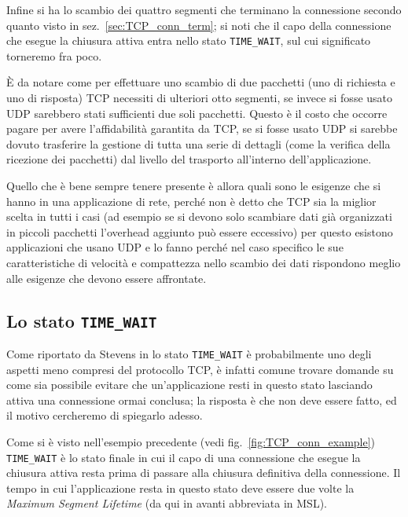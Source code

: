 Infine si ha lo scambio dei quattro segmenti che terminano la connessione
secondo quanto visto in sez.~\ref{sec:TCP_conn_term}; si noti che il capo della
connessione che esegue la chiusura attiva entra nello stato
\texttt{TIME\_WAIT}, sul cui significato torneremo fra poco.

È da notare come per effettuare uno scambio di due pacchetti (uno di richiesta
e uno di risposta) TCP necessiti di ulteriori otto segmenti, se invece si
fosse usato UDP sarebbero stati sufficienti due soli pacchetti. Questo è il
costo che occorre pagare per avere l'affidabilità garantita da TCP, se si
fosse usato UDP si sarebbe dovuto trasferire la gestione di tutta una serie di
dettagli (come la verifica della ricezione dei pacchetti) dal livello del
trasporto all'interno dell'applicazione.

Quello che è bene sempre tenere presente è allora quali sono le esigenze che
si hanno in una applicazione di rete, perché non è detto che TCP sia la
miglior scelta in tutti i casi (ad esempio se si devono solo scambiare dati
già organizzati in piccoli pacchetti l'overhead aggiunto può essere eccessivo)
per questo esistono applicazioni che usano UDP e lo fanno perché nel caso
specifico le sue caratteristiche di velocità e compattezza nello scambio dei
dati rispondono meglio alle esigenze che devono essere affrontate.


\subsection{Lo stato \texttt{TIME\_WAIT}}
\label{sec:TCP_time_wait}

Come riportato da Stevens in \cite{UNP1} lo stato \texttt{TIME\_WAIT} è
probabilmente uno degli aspetti meno compresi del protocollo TCP, è infatti
comune trovare domande su come sia possibile evitare che un'applicazione resti
in questo stato lasciando attiva una connessione ormai conclusa; la risposta è
che non deve essere fatto, ed il motivo cercheremo di spiegarlo adesso.

Come si è visto nell'esempio precedente (vedi fig.~\ref{fig:TCP_conn_example})
\texttt{TIME\_WAIT} è lo stato finale in cui il capo di una connessione che
esegue la chiusura attiva resta prima di passare alla chiusura definitiva
della connessione. Il tempo in cui l'applicazione resta in questo stato deve
essere due volte la \textit{Maximum Segment Lifetime} (da qui in avanti
abbreviata in MSL).

